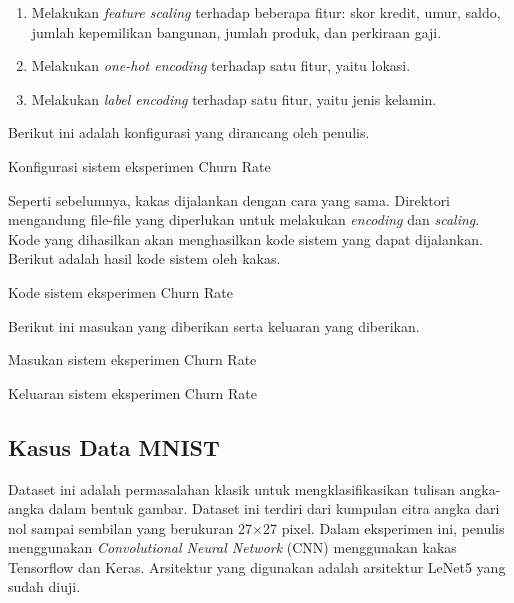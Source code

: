 \begin{enumerate}
	\item Melakukan \textit{feature scaling} terhadap beberapa fitur: skor kredit, umur, saldo, jumlah kepemilikan bangunan, jumlah produk, dan perkiraan gaji.
	\item Melakukan \textit{one-hot encoding} terhadap satu fitur, yaitu lokasi.
	\item Melakukan \textit{label encoding} terhadap satu fitur, yaitu jenis kelamin.
\end{enumerate}

Berikut ini adalah konfigurasi yang dirancang oleh penulis.

\begin{code}
	\caption{Konfigurasi sistem eksperimen Churn Rate}\label{listing:22}
\end{code}

Seperti sebelumnya, kakas dijalankan dengan cara yang sama.
Direktori mengandung file-file yang diperlukan untuk melakukan \textit{encoding} dan \textit{scaling}.
Kode yang dihasilkan akan menghasilkan kode sistem yang dapat dijalankan.
Berikut adalah hasil kode sistem oleh kakas.

\begin{code}
	\caption{Kode sistem eksperimen Churn Rate}\label{listing:23}
\end{code}

Berikut ini masukan yang diberikan serta keluaran yang diberikan.

\begin{code}
	\caption{Masukan sistem eksperimen Churn Rate}\label{listing:24}
\end{code}

\begin{code}
	\caption{Keluaran sistem eksperimen Churn Rate}\label{listing:25}
\end{code}

\subsection{Kasus Data MNIST}

Dataset ini adalah permasalahan klasik untuk mengklasifikasikan tulisan angka-angka dalam bentuk gambar.
Dataset ini terdiri dari kumpulan citra angka dari nol sampai sembilan yang berukuran 27\(\times\)27 pixel.
Dalam eksperimen ini, penulis menggunakan \textit{Convolutional Neural Network} (CNN) menggunakan kakas Tensorflow dan Keras.
Arsitektur yang digunakan adalah arsitektur LeNet5 yang sudah diuji.

